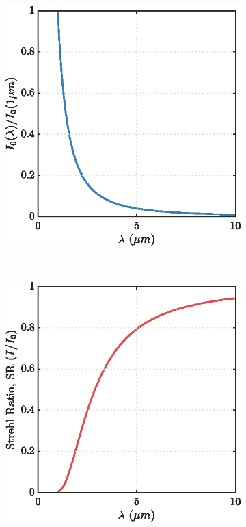 \begin{figure}
  \centering
  \begin{subfigure}[t]{0.45\textwidth}
    \includegraphics{../matlab/02_background/farfield_intensity.eps}
    \caption{}\label{fig:02_farfield_intensity}
  \end{subfigure}
  ~
  \begin{subfigure}[t]{0.45\textwidth}
    \includegraphics{../matlab/02_background/all_strehl_ratio.eps}

\end{subfigure}
\end{figure}

